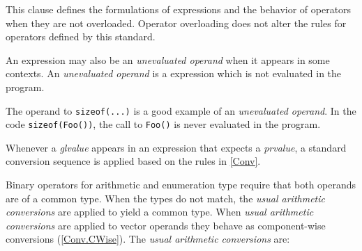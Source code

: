 
\p This clause defines the formulations of expressions and the behavior of
operators when they are not overloaded. Operator overloading does not alter the
rules for operators defined by this standard.

\p An expression may also be an \textit{unevaluated operand} when it appears in
some contexts. An \textit{unevaluated operand} is a expression which is not
evaluated in the program.

\begin{note}
  The operand to \texttt{sizeof(...)} is a good example of an
  \textit{unevaluated operand}. In the code \texttt{sizeof(Foo())}, the call to
  \texttt{Foo()} is never evaluated in the program.
\end{note}

\p Whenever a \textit{glvalue} appears in an expression that expects a
\textit{prvalue}, a standard conversion sequence is applied based on the rules
in \ref{Conv}.


\p Binary operators for arithmetic and enumeration type require that both
operands are of a common type. When the types do not match, the \textit{usual
arithmetic conversions} are applied to yield a common type. When \textit{usual
arithmetic conversions} are applied to vector operands they behave as
component-wise conversions (\ref{Conv.CWise}). The \textit{usual arithmetic
conversions} are:

